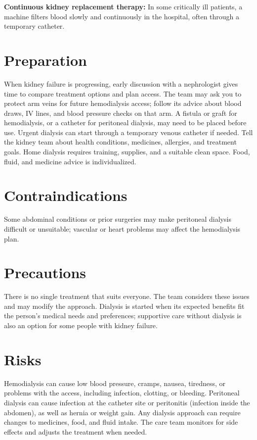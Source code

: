 \textbf{Continuous kidney replacement therapy:} In some critically ill patients, a machine filters blood slowly and continuously in the hospital, often through a temporary catheter.

\section*{Preparation}
When kidney failure is progressing, early discussion with a nephrologist gives time to compare treatment options and plan access. The team may ask you to protect arm veins for future hemodialysis access; follow its advice about blood draws, IV lines, and blood pressure checks on that arm. A fistula or graft for hemodialysis, or a catheter for peritoneal dialysis, may need to be placed before use. Urgent dialysis can start through a temporary venous catheter if needed. Tell the kidney team about health conditions, medicines, allergies, and treatment goals. Home dialysis requires training, supplies, and a suitable clean space. Food, fluid, and medicine advice is individualized.

\section*{Contraindications}
Some abdominal conditions or prior surgeries may make peritoneal dialysis difficult or unsuitable; vascular or heart problems may affect the hemodialysis plan.

\section*{Precautions}
There is no single treatment that suits everyone. The team considers these issues and may modify the approach. Dialysis is started when its expected benefits fit the person's medical needs and preferences; supportive care without dialysis is also an option for some people with kidney failure.

\section*{Risks}
Hemodialysis can cause low blood pressure, cramps, nausea, tiredness, or problems with the access, including infection, clotting, or bleeding. Peritoneal dialysis can cause infection at the catheter site or peritonitis (infection inside the abdomen), as well as hernia or weight gain. Any dialysis approach can require changes to medicines, food, and fluid intake. The care team monitors for side effects and adjusts the treatment when needed.

